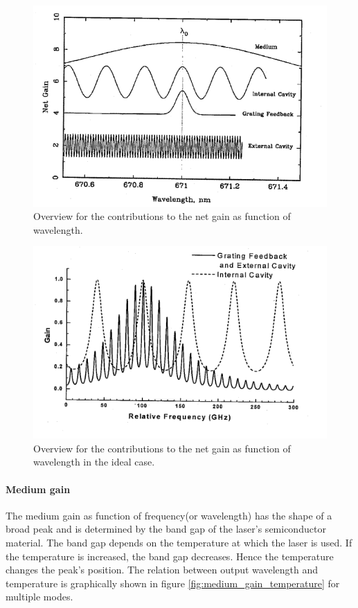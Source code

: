 \FloatBarrier
\begin{figure}
  \includegraphics[width=\textwidth]{gain_overview.png}
  \caption{Overview for the contributions to the net gain as function of
            wavelength.\cite{V61}}
  \label{fig:gain_overview}
\end{figure}
\FloatBarrier

\FloatBarrier
\begin{figure}
  \includegraphics[width=\textwidth]{ideal_gain_overview.png}
  \caption{Overview for the contributions to the net gain as function of
            wavelength in the ideal case.\cite{V61}}
  \label{fig:ideal_gain_overview}
\end{figure}
\FloatBarrier


\paragraph{Medium gain}
The medium gain as function of frequency(or wavelength) has
the shape of a broad peak and is determined by the band gap of
the laser's semiconductor material.
The band gap depends on the temperature at which the laser is used.
If the temperature is increased, the band gap decreases.
Hence the temperature changes the peak's position.
The relation between output wavelength and
temperature is graphically shown
in figure \ref{fig:medium_gain_temperature}
for multiple modes.




